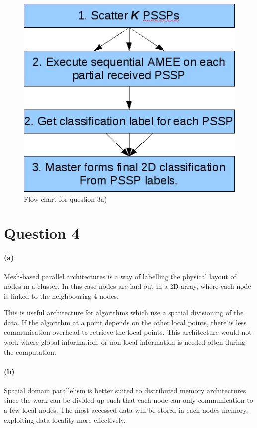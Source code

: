 \documentclass{article}
\begin{document}
\begin{figure}[tp]
\centering \includegraphics[scale=0.7]{question3_a.png}
\caption{Flow chart for question 3a)}\label{fig:3a}
\end{figure}


\section*{Question 4}

\paragraph{(a)}
Mesh-based parallel architectures is a way of labelling the physical layout of
nodes in a cluster. In this case nodes are laid out in a 2D array, where each
node is linked to the neighbouring 4 nodes.

This is useful architecture for algorithms which use a spatial divisioning of
the data. If the algorithm at a point depends on the other local points, there
is less communication overhead to retrieve the local points. This architecture
would not work where global information, or non-local information is needed
often during the computation.

\paragraph{(b)}
Spatial domain parallelism is better suited to distributed memory
architectures since the work can be divided up such that each node can only
communication to a few local nodes. The most accessed data will be stored in
each nodes memory, exploiting data locality more effectively.
\end{document}
